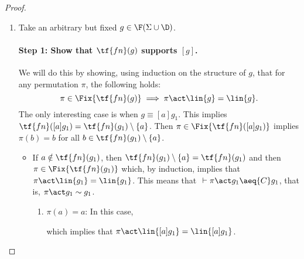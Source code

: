 \begin{proof}
\begin{enumerate}
    \item Take an arbitrary but fixed $g\in\F(\Sigma\cup\D)$.

    \paragraph*{Step 1: Show that $\tf{fn}(g)$ supports $[g]$.}  We will do this by showing, using induction on the structure of $g$, that for any permutation $\pi$, the following holds:
    \[
        \pi\in\Fix{\tf{fn}(g)} \implies \pi\act \lin{g} = \lin{g}.
    \]
    The only interesting case is when $g \equiv [a]g_1$. This implies $\tf{fn}([a]g_1) = \tf{fn}(g_1)\setminus\{a\}$. Then $\pi\in\Fix{\tf{fn}([a]g_1)}$ implies $\pi(b) = b$ for all $b \in  \tf{fn}(g_1)\setminus\{a\}$.

            \begin{itemize}
                \item If $a\notin \tf{fn}(g_1)$, then $ \tf{fn}(g_1) \setminus \{a\} =  \tf{fn}(g_1)$ and then $\pi\in\Fix{\tf{fn}(g_1)}$ which, by induction, implies that $\pi\act \lin{g_1} = \lin{g_1}$. This means that $~\vdash \pi\act g_1 \aeq{C} g_1$, that is, $\pi\act g_1 \sim g_1$.

                \begin{enumerate}
                    \item $\pi(a) = a$: In this case,
                    \begin{prooftree}
                    \end{prooftree}
                    which implies that $\pi\act \lin{[a]g_1} = \lin{[a]g_1}$.


\end{enumerate}
\end{itemize}
\end{enumerate}
\end{proof}
